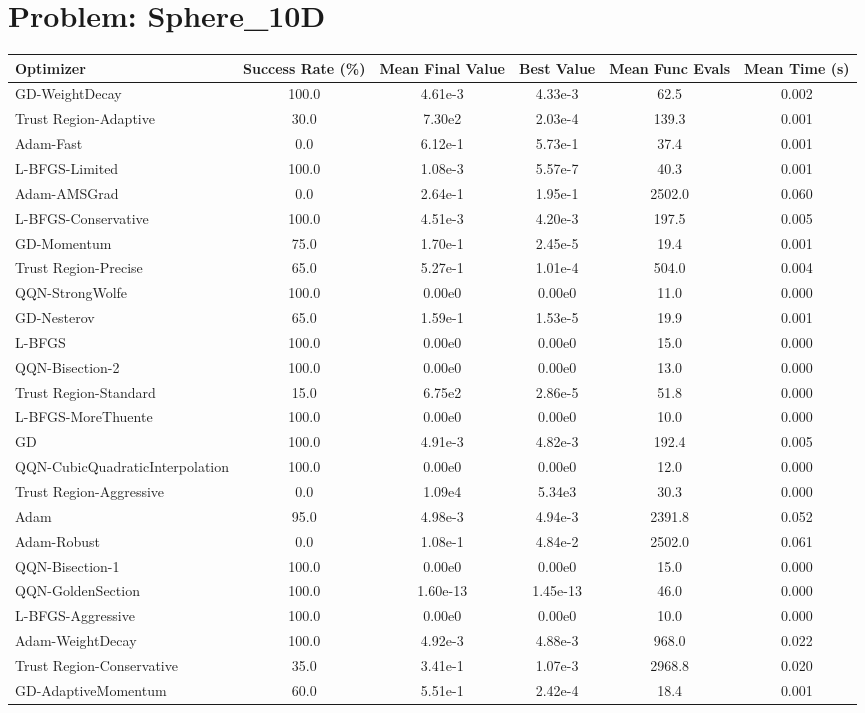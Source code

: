 \documentclass{article}
\begin{document}
\section{Problem: Sphere\_10D}
\begin{longtable}{p{3cm}*{5}{c}}
\toprule
\textbf{Optimizer} & \textbf{Success Rate (\%)} & \textbf{Mean Final Value} & \textbf{Best Value} & \textbf{Mean Func Evals} & \textbf{Mean Time (s)} \\
\midrule
GD-WeightDecay & 100.0 & 4.61e-3 & 4.33e-3 & 62.5 & 0.002 \\
Trust Region-Adaptive & 30.0 & 7.30e2 & 2.03e-4 & 139.3 & 0.001 \\
Adam-Fast & 0.0 & 6.12e-1 & 5.73e-1 & 37.4 & 0.001 \\
L-BFGS-Limited & 100.0 & 1.08e-3 & 5.57e-7 & 40.3 & 0.001 \\
Adam-AMSGrad & 0.0 & 2.64e-1 & 1.95e-1 & 2502.0 & 0.060 \\
L-BFGS-Conservative & 100.0 & 4.51e-3 & 4.20e-3 & 197.5 & 0.005 \\
GD-Momentum & 75.0 & 1.70e-1 & 2.45e-5 & 19.4 & 0.001 \\
Trust Region-Precise & 65.0 & 5.27e-1 & 1.01e-4 & 504.0 & 0.004 \\
QQN-StrongWolfe & 100.0 & 0.00e0 & 0.00e0 & 11.0 & 0.000 \\
GD-Nesterov & 65.0 & 1.59e-1 & 1.53e-5 & 19.9 & 0.001 \\
L-BFGS & 100.0 & 0.00e0 & 0.00e0 & 15.0 & 0.000 \\
QQN-Bisection-2 & 100.0 & 0.00e0 & 0.00e0 & 13.0 & 0.000 \\
Trust Region-Standard & 15.0 & 6.75e2 & 2.86e-5 & 51.8 & 0.000 \\
L-BFGS-MoreThuente & 100.0 & 0.00e0 & 0.00e0 & 10.0 & 0.000 \\
GD & 100.0 & 4.91e-3 & 4.82e-3 & 192.4 & 0.005 \\
QQN-CubicQuadraticInterpolation & 100.0 & 0.00e0 & 0.00e0 & 12.0 & 0.000 \\
Trust Region-Aggressive & 0.0 & 1.09e4 & 5.34e3 & 30.3 & 0.000 \\
Adam & 95.0 & 4.98e-3 & 4.94e-3 & 2391.8 & 0.052 \\
Adam-Robust & 0.0 & 1.08e-1 & 4.84e-2 & 2502.0 & 0.061 \\
QQN-Bisection-1 & 100.0 & 0.00e0 & 0.00e0 & 15.0 & 0.000 \\
QQN-GoldenSection & 100.0 & 1.60e-13 & 1.45e-13 & 46.0 & 0.000 \\
L-BFGS-Aggressive & 100.0 & 0.00e0 & 0.00e0 & 10.0 & 0.000 \\
Adam-WeightDecay & 100.0 & 4.92e-3 & 4.88e-3 & 968.0 & 0.022 \\
Trust Region-Conservative & 35.0 & 3.41e-1 & 1.07e-3 & 2968.8 & 0.020 \\
GD-AdaptiveMomentum & 60.0 & 5.51e-1 & 2.42e-4 & 18.4 & 0.001 \\
\bottomrule
\end{longtable}
\end{document}
